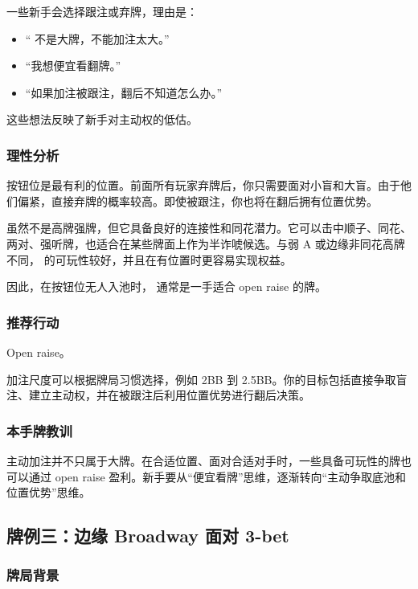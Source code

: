 一些新手会选择跟注或弃牌，理由是：

\begin{itemize}
\item “ 不是大牌，不能加注太大。”
\item “我想便宜看翻牌。”
\item “如果加注被跟注，翻后不知道怎么办。”
\end{itemize}

这些想法反映了新手对主动权的低估。

\subsubsection*{理性分析}

按钮位是最有利的位置。前面所有玩家弃牌后，你只需要面对小盲和大盲。由于他们偏紧，直接弃牌的概率较高。即使被跟注，你也将在翻后拥有位置优势。

 虽然不是高牌强牌，但它具备良好的连接性和同花潜力。它可以击中顺子、同花、两对、强听牌，也适合在某些牌面上作为半诈唬候选。与弱 A 或边缘非同花高牌不同， 的可玩性较好，并且在有位置时更容易实现权益。

因此，在按钮位无人入池时， 通常是一手适合 open raise 的牌。

\subsubsection*{推荐行动}

Open raise。

加注尺度可以根据牌局习惯选择，例如 2BB 到 2.5BB。你的目标包括直接争取盲注、建立主动权，并在被跟注后利用位置优势进行翻后决策。

\subsubsection*{本手牌教训}

主动加注并不只属于大牌。在合适位置、面对合适对手时，一些具备可玩性的牌也可以通过 open raise 盈利。新手要从“便宜看牌”思维，逐渐转向“主动争取底池和位置优势”思维。

\subsection{牌例三：边缘 Broadway 面对 3-bet}

\subsubsection*{牌局背景}

